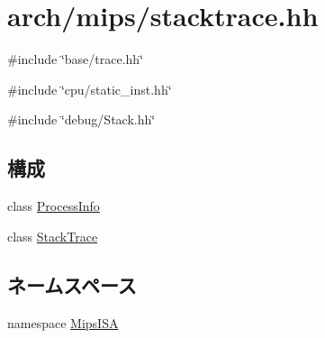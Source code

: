\hypertarget{mips_2stacktrace_8hh}{
\section{arch/mips/stacktrace.hh}
\label{mips_2stacktrace_8hh}
}
{\ttfamily \#include \char`\"{}base/trace.hh\char`\"{}}\par
{\ttfamily \#include \char`\"{}cpu/static\_\-inst.hh\char`\"{}}\par
{\ttfamily \#include \char`\"{}debug/Stack.hh\char`\"{}}\par
\subsection*{構成}
\begin{DoxyCompactItemize}
\item 
class \hyperlink{classMipsISA_1_1ProcessInfo}{ProcessInfo}
\item 
class \hyperlink{classMipsISA_1_1StackTrace}{StackTrace}
\end{DoxyCompactItemize}
\subsection*{ネームスペース}
\begin{DoxyCompactItemize}
\item 
namespace \hyperlink{namespaceMipsISA}{MipsISA}
\end{DoxyCompactItemize}
